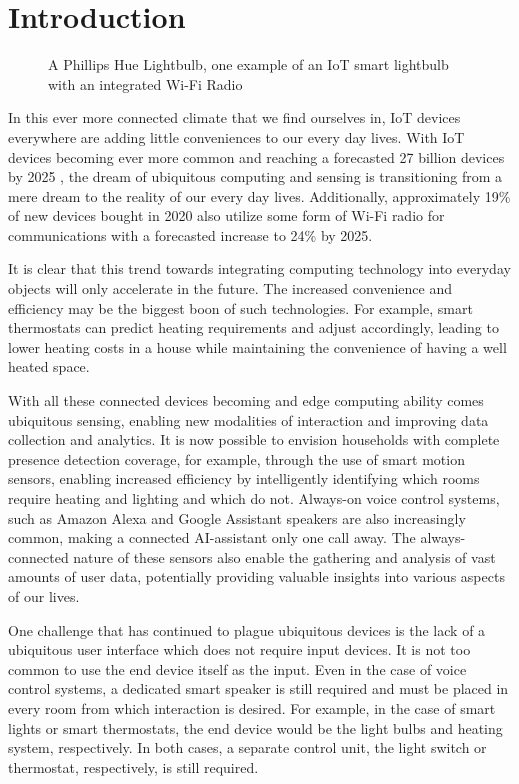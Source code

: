 \chapter{Introduction}\label{chapter:introduction}

\begin{figure}
	\centering
	\caption{A Phillips Hue Lightbulb, one example of an IoT smart lightbulb with an integrated Wi-Fi Radio}
	\label{fig:phillips-hue-lightbulb}
\end{figure}

In this ever more connected climate that we find ourselves in, IoT devices everywhere are adding little conveniences to our every day lives.
With IoT devices becoming ever more common and reaching a forecasted 27 billion devices by 2025 \cite{hasan2022state}, the dream of ubiquitous computing and sensing is transitioning from a mere dream to the reality of our every day lives.
Additionally, approximately 19\% of new devices bought in 2020 also utilize some form of Wi-Fi radio for communications with a forecasted increase to 24\% by 2025.

It is clear that this trend towards integrating computing technology into everyday objects will only accelerate in the future.
The increased convenience and efficiency may be the biggest boon of such technologies.
For example, smart thermostats can predict heating requirements and adjust accordingly, leading to lower heating costs in a house while maintaining the convenience of having a well heated space.

With all these connected devices becoming and edge computing ability comes ubiquitous sensing, enabling new modalities of interaction and improving data collection and analytics.
It is now possible to envision households with complete presence detection coverage, for example, through the use of smart motion sensors, enabling increased efficiency by intelligently identifying which rooms require heating and lighting and which do not.
Always-on voice control systems, such as Amazon Alexa and Google Assistant speakers are also increasingly common, making a connected AI-assistant only one call away.
The always-connected nature of these sensors also enable the gathering and analysis of vast amounts of user data, potentially providing valuable insights into various aspects of our lives.

One challenge that has continued to plague ubiquitous devices is the lack of a ubiquitous user interface which does not require input devices.
It is not too common to use the end device itself as the input.
Even in the case of voice control systems, a dedicated smart speaker is still required and must be placed in every room from which interaction is desired.
For example, in the case of smart lights or smart thermostats, the end device would be the light bulbs and heating system, respectively.
In both cases, a separate control unit, the light switch or thermostat, respectively, is still required.

